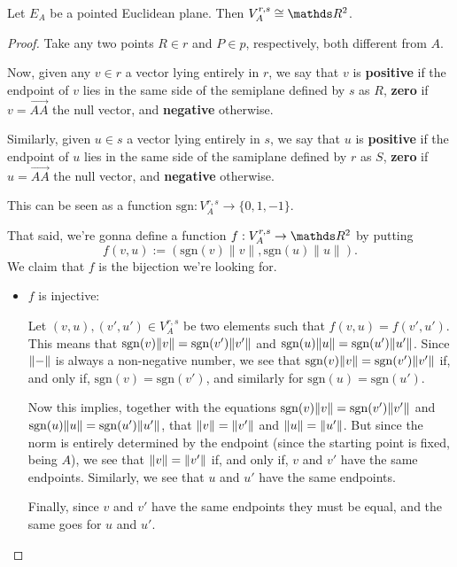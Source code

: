 \begin{theorem}
	Let $E_A$ be a pointed Euclidean plane. Then $V^{r,s}_A\iso \R^2$.
\end{theorem}
\begin{proof}
	Take any two points $R\in r$ and $P\in p$, respectively, both different from $A$.
	
	Now, given any $v\in r$ a vector lying entirely in $r$, we say that $v$ is \textbf{positive} if the endpoint of $v$ lies in the same side of the semiplane defined by $s$ as $R$, \textbf{zero} if $v=\overrightarrow{AA}$ the null vector, and \textbf{negative} otherwise.
	
	Similarly, given $u\in s$ a vector lying entirely in $s$, we say that $u$ is \textbf{positive} if the endpoint of $u$ lies in the same side of the samiplane defined by $r$ as $S$, \textbf{zero} if $u=\overrightarrow{AA}$ the null vector, and \textbf{negative} otherwise.
	
	This can be seen as a function $\mathrm{sgn}:V^{r,s}_A\to\{0,1,-1\}$.
	
	That said, we're gonna define a function $f:V^{r,s}_A\to \R^2$ by putting $$f(v,u):=(\mathrm{sgn}(v)\lVert v\rVert,\mathrm{sgn}(u)\lVert u\rVert).$$ We claim that $f$ is the bijection we're looking for.
	
	\begin{itemize}
		\item $f$ is injective:
		
		Let $(v,u),(v',u')\in V^{r,s}_A$ be two elements such that $f(v,u)=f(v',u')$. This means that $\mathrm{sgn}(v)\lVert v\rVert=\mathrm{sgn}(v')\lVert v'\rVert$ and $\mathrm{sgn}(u)\lVert u\rVert=\mathrm{sgn}(u')\lVert u'\rVert$. Since $\lVert-\rVert$ is always a non-negative number, we see that $\mathrm{sgn}(v)\lVert v\rVert=\mathrm{sgn}(v')\lVert v'\rVert$ if, and only if, $\mathrm{sgn}(v)=\mathrm{sgn}(v')$, and similarly for $\mathrm{sgn}(u)=\mathrm{sgn}(u')$.
		
		Now this implies, together with the equations $\mathrm{sgn}(v)\lVert v\rVert=\mathrm{sgn}(v')\lVert v'\rVert$ and $\mathrm{sgn}(u)\lVert u\rVert=\mathrm{sgn}(u')\lVert u'\rVert$, that $\lVert v\rVert=\lVert v'\rVert$ and $\lVert u\rVert=\lVert u'\rVert$. But since the norm is entirely determined by the endpoint (since the starting point is fixed, being $A$), we see that $\lVert v\rVert=\lVert v'\rVert$ if, and only if, $v$ and $v'$ have the same endpoints. Similarly, we see that $u$ and $u'$ have the same endpoints.
		
		Finally, since $v$ and $v'$ have the same endpoints they must be equal, and the same goes for $u$ and $u'$.
		

\end{itemize}
\end{proof}

